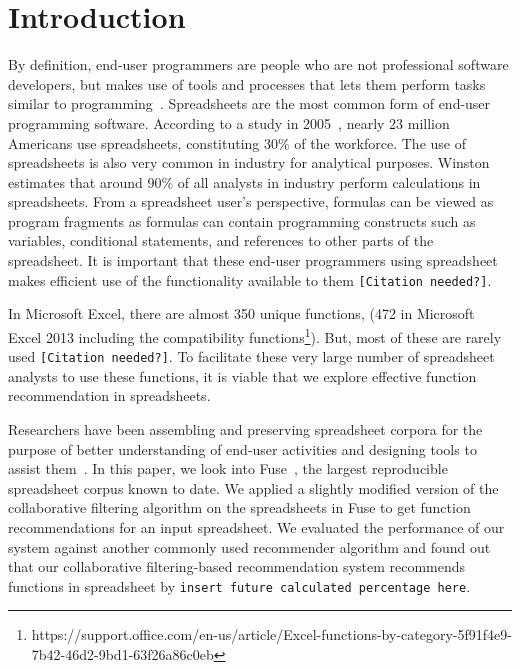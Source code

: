 \documentclass[conference]{IEEEtran}
\begin{document}
%
\IEEEpeerreviewmaketitle

\section{Introduction}

By definition, end-user programmers are people who are not professional software developers, but makes use of tools and processes that lets them perform tasks similar to programming~\cite{ko2011state}. Spreadsheets are the most common form of  end-user programming software. According to a study in 2005~\cite{scaffidi2005estimating}, nearly 23 million Americans use spreadsheets, constituting 30\% of the workforce. The use of spreadsheets is also very common in industry for analytical purposes. Winston~\cite{winston2001executive} estimates that around 90\% of all analysts in industry perform calculations in spreadsheets. From a spreadsheet user's perspective, formulas can be viewed as program fragments as formulas can contain programming constructs such as variables, conditional statements, and references to other parts of the spreadsheet. It is important that these end-user programmers using spreadsheet makes efficient use of the functionality available to them \texttt{[Citation needed?]}.

In Microsoft Excel, there are almost 350 unique functions, (472 in Microsoft Excel 2013 including the compatibility functions\footnote{https://support.office.com/en-us/article/Excel-functions-by-category-5f91f4e9-7b42-46d2-9bd1-63f26a86c0eb}). But, most of these are rarely used \texttt{[Citation needed?]}. To facilitate these very large number of spreadsheet analysts to use these functions, it is viable that we explore effective function recommendation in spreadsheets.

Researchers have been assembling and preserving spreadsheet corpora for the purpose of better understanding of end-user activities and designing tools to assist them~\cite{fisher2005euses, hermans2014enron}. In this paper, we look into Fuse~\cite{barik2015fuse}, the largest reproducible spreadsheet corpus known to date. We applied a slightly modified version of the collaborative filtering algorithm on the spreadsheets in Fuse to get function recommendations for an input spreadsheet. We evaluated the performance of our system against another commonly used recommender algorithm and found out that our collaborative filtering-based recommendation system recommends functions in spreadsheet by \texttt{insert future calculated percentage here}. 
\end{document}
